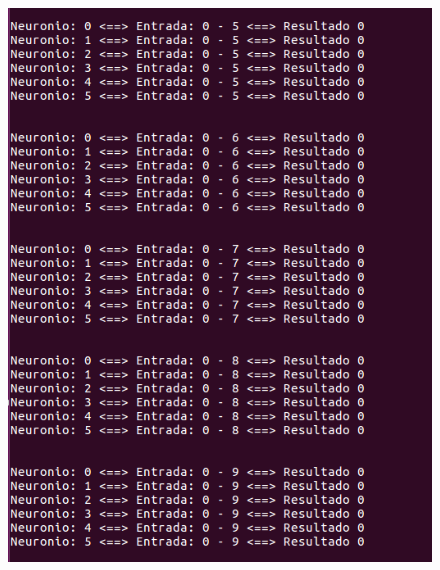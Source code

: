 \documentclass[hidelinks,12pt]{article}
\begin{document}
		\begin{figure}[!h]
			\centering
			\includegraphics[scale=0.5]{Figures/E3S0P2R.png}
		\end{figure}
		
\end{document}
